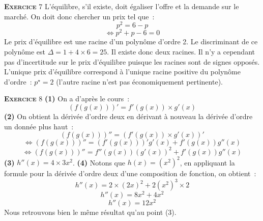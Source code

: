 \documentclass[10pt,a4paper,notitlepage]{article}
\newcommand{\exercice}[1]{\textsc{\textbf{Exercice}} #1}
\begin{document}
\exercice{7} L'équilibre, s'il existe, doit égaliser l'offre et la
demande sur le marché. On doit donc chercher un prix tel que :
\[
p^2=6-p
\]
\[
\Leftrightarrow p^2+p-6 = 0
\]
Le prix d'équilibre est une racine d'un polynôme d'ordre 2. Le
discriminant de ce polynôme est $\Delta = 1+4\times 6 = 25$. Il existe
donc deux racines. Il n'y a cependant pas d'incertitude sur le prix
d'équilibre puisque les racines sont de signes opposés. L'unique prix
d'équilibre correspond à l'unique racine positive du polynôme
d'ordre : $p^{\star}=2$ (l'autre racine n'est pas économiquement pertinente). 

\bigskip

\exercice{8} \textbf{(1)} On a d'après le cours :
\[
\left(f(g(x))\right)' = f'(g(x))\times g'(x)
\]
\textbf{(2)} On obtient la dérivée d'ordre deux en dérivant à nouveau
la dérivée d'ordre un donnée plus haut :
\[
\left(f(g(x))\right)'' = \left(f'(g(x))\times g'(x)\right)'
\]
\[
\Leftrightarrow \left(f(g(x))\right)'' = \left(f'(g(x))\right)'g'(x) + f'(g(x))g''(x)
\]
\[
\Leftrightarrow \left(f(g(x))\right)'' = f''(g(x))\left(g'(x)\right)^2 + f'(g(x))g''(x)
\]
\textbf{(3)} $h''(x) = 4 \times 3 x^2$. \textbf{(4)} Notons que
$h(x)=\left(x^2\right)^2$, en appliquant la formule pour la dérivée
d'ordre deux d'une composition de fonction, on obtient :
\[
h''(x) = 2 \times (2x)^2 + 2 (x^2)^3 \times 2
\]
\[
h''(x) = 8 x^2 +  4 x^2
\]
\[
h''(x) = 12 x^2
\]
Nous retrouvons bien le même résultat qu'au point (3).
\end{document}
